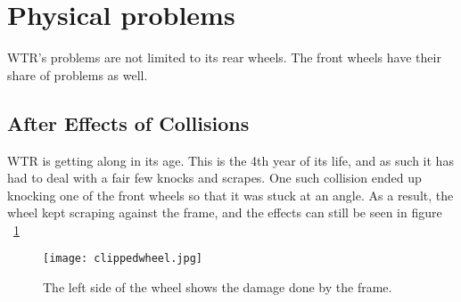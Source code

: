 \section{Physical problems}
WTR's problems are not limited to its rear wheels.
The front wheels have their share of problems as well.

\subsection{After Effects of Collisions}
WTR is getting along in its age.
This is the 4th year of its life, and as such it has had to deal with a fair few knocks and scrapes.
One such collision ended up knocking one of the front wheels so that it was stuck at an angle.
As a result, the wheel kept scraping against the frame, and the effects can still be seen in figure ~\ref{fig::wheelclip}

\begin{figure}[H]
\centering
\texttt{[image: clippedwheel.jpg]}
\label{fig::wheelclip}
\caption{The left side of the wheel shows the damage done by the frame.}
\end{figure}





\newpage